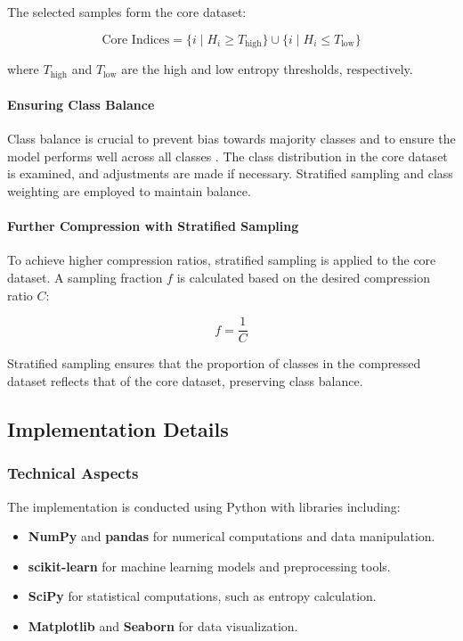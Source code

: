 \documentclass{article}
\begin{document}
The selected samples form the core dataset:

\begin{equation}
\text{Core Indices} = \{i \mid H_i \geq T_{\text{high}}\} \cup \{i \mid H_i \leq T_{\text{low}}\}
\end{equation}

where $T_{\text{high}}$ and $T_{\text{low}}$ are the high and low entropy thresholds, respectively.

\paragraph{Ensuring Class Balance}

Class balance is crucial to prevent bias towards majority classes and to ensure the model performs well across all classes \cite{he2009learning}. The class distribution in the core dataset is examined, and adjustments are made if necessary. Stratified sampling and class weighting are employed to maintain balance.

\paragraph{Further Compression with Stratified Sampling}

To achieve higher compression ratios, stratified sampling is applied to the core dataset. A sampling fraction $f$ is calculated based on the desired compression ratio $C$:

\begin{equation}
f = \frac{1}{C}
\end{equation}

Stratified sampling ensures that the proportion of classes in the compressed dataset reflects that of the core dataset, preserving class balance.

\subsection{Implementation Details}

\subsubsection{Technical Aspects}

The implementation is conducted using Python with libraries including:

\begin{itemize}
    \item \textbf{NumPy} and \textbf{pandas} for numerical computations and data manipulation.
    \item \textbf{scikit-learn} for machine learning models and preprocessing tools.
    \item \textbf{SciPy} for statistical computations, such as entropy calculation.
    \item \textbf{Matplotlib} and \textbf{Seaborn} for data visualization.
\end{itemize}
\end{document}
